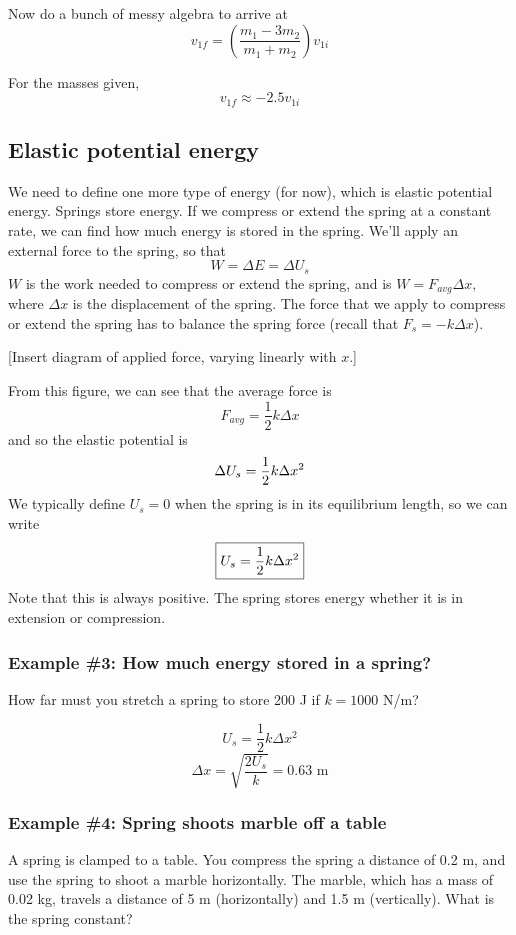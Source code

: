 Now do a bunch of messy algebra to arrive at
$$\boxed{v_{1f}=\left(\frac{m_1-3m_2}{m_1+m_2}\right)v_{1i}}$$

For the masses given,
$$v_{1f}\approx -2.5v_{1i}$$ 

\subsection{Elastic potential energy}
We need to define one more type of energy (for now), which is elastic potential energy. Springs store energy. If we compress or extend the spring at a constant rate, we can find how much energy is stored in the spring. We'll apply an external force to the spring, so that
$$W=\Delta{E}=\Delta{U_s}$$
$W$ is the work needed to compress or extend the spring, and is
$W=F_{avg}\Delta{x},$
where $\Delta{x}$ is the displacement of the spring. The force that we apply to compress or extend the spring has to balance the spring force (recall that $F_s=-k\Delta{x}$).

[Insert diagram of applied force, varying linearly with $x$.]
\vspace{5cm}


From this figure, we can see that the average force is
$$F_{avg}=\frac{1}{2}k\Delta{x}$$
and so the elastic potential is
$$\Delta{U_s}=\frac{1}{2}k\Delta{x}\displaystyle^2$$
We typically define $U_s=0$ when the spring is in its equilibrium length, so we can write
$$\boxed{U_s=\frac{1}{2}k\Delta{x}\displaystyle^2}$$
Note that this is always positive. The spring stores energy whether it is in extension or compression.

\subsubsection{Example \#3: How much energy stored in a spring?}
How far must you stretch a spring to store 200 J if $k=1000$ N/m?

$$U_s=\frac{1}{2}k\Delta{x}^2$$
$$\Delta{x}=\sqrt{\frac{2U_s}{k}}=0.63\mbox{ m}$$

\subsubsection{Example \#4: Spring shoots marble off a table}
A spring is clamped to a table. You compress the spring a distance of 0.2 m, and use the spring to shoot a marble horizontally. The marble, which has a mass of 0.02 kg, travels a distance of 5 m (horizontally) and 1.5 m (vertically). What is the spring constant?

